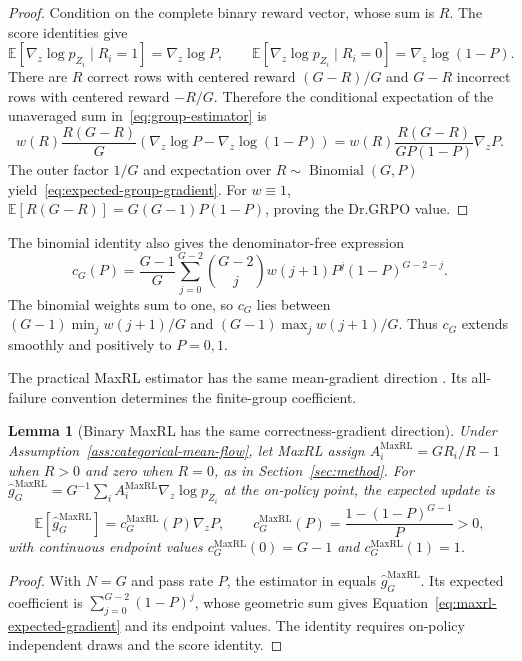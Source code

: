 \documentclass{article}
\newcommand{\enforcehalffinalproseline}{%
  \setlength{\parfillskip}{0pt plus .20\linewidth}}
\newcommand{\1}{\mathbf 1}
\newcommand{\E}{\mathbb E}
\newtheorem{lemma}{Lemma}[section]
\theoremstyle{remark}
\theoremstyle{definition}
\theoremstyle{plain}
\begin{document}
\begin{proof}
\enforcehalffinalproseline
Condition on the complete binary reward vector, whose sum is $R$. The score
identities give
\[
  \E[\nabla_z\log p_{Z_i}\mid R_i=1]=\nabla_z\log P,
  \qquad
  \E[\nabla_z\log p_{Z_i}\mid R_i=0]
  =\nabla_z\log(1-P).
\]
There are $R$ correct rows with centered reward $(G-R)/G$ and $G-R$
incorrect rows with centered reward $-R/G$. Therefore the conditional
expectation of the unaveraged sum in~\eqref{eq:group-estimator} is
\[
  w(R)\frac{R(G-R)}{G}
  \left(\nabla_z\log P-\nabla_z\log(1-P)\right)
  =w(R)\frac{R(G-R)}{GP(1-P)}\nabla_zP.
\]
The outer factor $1/G$ and expectation over
$R\sim\operatorname{Binomial}(G,P)$ yield~\eqref{eq:expected-group-gradient}.
For $w\equiv1$,
$\E[R(G-R)]=G(G-1)P(1-P)$, proving the Dr.GRPO value.
\end{proof}

The binomial identity also gives the denominator-free expression
\[
 c_G(P)=\frac{G-1}{G}\sum_{j=0}^{G-2}\binom{G-2}{j}
 w(j+1)P^j(1-P)^{G-2-j}.
\]
The binomial weights sum to one, so $c_G$ lies between
$(G-1)\min_j w(j+1)/G$ and $(G-1)\max_j w(j+1)/G$.
Thus $c_G$ extends smoothly and positively to $P=0,1$.

The practical MaxRL estimator has the same mean-gradient direction
\citep[Section~4.3 and App.~D, Theorem~5]{tajwar2026maxrl}. Its all-failure
convention determines the finite-group coefficient.

\begin{lemma}[Binary MaxRL has the same correctness-gradient direction]
\enforcehalffinalproseline
\label{lem:maxrl-mean}
Under Assumption~\ref{ass:categorical-mean-flow}, let MaxRL assign
$A_i^{\mathrm{MaxRL}}=GR_i/R-1$ when $R>0$ and zero when $R=0$, as in
Section~\ref{sec:method}. For
$\widehat g_G^{\mathrm{MaxRL}}=G^{-1}\sum_i
 A_i^{\mathrm{MaxRL}}\nabla_z\log p_{Z_i}$ at the on-policy point, the
expected update is
\begin{equation}
  \E[\widehat g_G^{\mathrm{MaxRL}}]
  =c_G^{\mathrm{MaxRL}}(P)\nabla_zP,
  \qquad
  c_G^{\mathrm{MaxRL}}(P)
  =\frac{1-(1-P)^{G-1}}{P}>0,
  \label{eq:maxrl-expected-gradient}
\end{equation}
with continuous endpoint values
$c_G^{\mathrm{MaxRL}}(0)=G-1$ and
$c_G^{\mathrm{MaxRL}}(1)=1$.
\end{lemma}

\begin{proof}
\enforcehalffinalproseline
With $N=G$ and pass rate $P$, the estimator in
\citet[Theorem~5]{tajwar2026maxrl} equals
$\widehat g_G^{\mathrm{MaxRL}}$. Its expected coefficient is
$\sum_{j=0}^{G-2}(1-P)^j$, whose geometric sum gives
Equation~\eqref{eq:maxrl-expected-gradient} and its endpoint values.
The identity requires on-policy independent draws and the score identity.
\end{proof}
\end{document}
